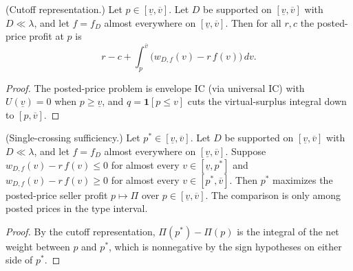 \begin{theorem}\label{thm:MathEconLib.ValueDistribution.sellerProfit_postedPriceProblem_eq_intervalIntegral_netVirtualSurplus}\leanok
{}
(Cutoff representation.) Let $p\in[\underline v,\overline v]$. Let $D$ be supported on $[\underline v,\overline v]$ with $D\ll\lambda$, and let $f=f_D$ almost everywhere on $[\underline v,\overline v]$. Then for all $r,c$ the posted-price profit at $p$ is
\[
r-c+\int_{p}^{\overline v}\bigl(w_{D,f}(v)-r\,f(v)\bigr)\,dv .
\]
\end{theorem}
\begin{proof}\leanok
{}
The posted-price problem is envelope IC (via universal IC) with $U(\underline v)=0$ when $p\ge\underline v$, and $q=\mathbf 1[p\le v]$ cuts the virtual-surplus integral down to $[p,\overline v]$.
\end{proof}

\begin{theorem}\label{thm:MathEconLib.ValueDistribution.isMaxOn_sellerProfit_postedPriceProblem_of_netVirtualSurplus_sign}\leanok
{}
(Single-crossing sufficiency.) Let $p^*\in[\underline v,\overline v]$. Let $D$ be supported on $[\underline v,\overline v]$ with $D\ll\lambda$, and let $f=f_D$ almost everywhere on $[\underline v,\overline v]$. Suppose $w_{D,f}(v)-r\,f(v)\le0$ for almost every $v\in[\underline v,p^*]$ and $w_{D,f}(v)-r\,f(v)\ge0$ for almost every $v\in[p^*,\overline v]$. Then $p^*$ maximizes the posted-price seller profit $p\mapsto\Pi$ over $p\in[\underline v,\overline v]$. The comparison is only among posted prices in the type interval.
\end{theorem}
\begin{proof}\leanok
{}
By the cutoff representation, $\Pi(p^*)-\Pi(p)$ is the integral of the net weight between $p$ and $p^*$, which is nonnegative by the sign hypotheses on either side of $p^*$.
\end{proof}

